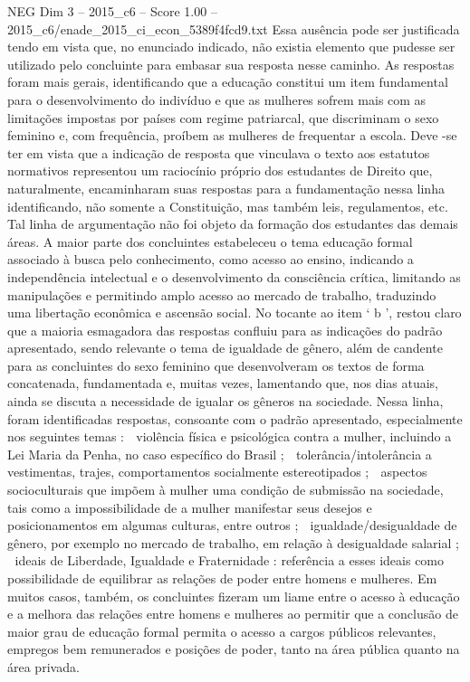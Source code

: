 \begin{textsample}{NEG Dim 3 – 2015\_c6 – Score 1.00 – 2015\_c6/enade\_2015\_ci\_econ\_5389f4fcd9.txt}
Essa ausência pode ser justificada tendo em vista que, no enunciado indicado, não existia elemento que pudesse ser utilizado pelo concluinte para embasar sua resposta nesse caminho.
As respostas foram mais gerais, identificando que a educação constitui um item fundamental para o desenvolvimento do indivíduo e que as mulheres sofrem mais com as limitações impostas por países com regime patriarcal, que discriminam o sexo feminino e, com frequência, proíbem as mulheres de frequentar a escola.
Deve -se ter em vista que a indicação de resposta que vinculava o texto aos estatutos normativos representou um raciocínio próprio dos estudantes de Direito que, naturalmente, encaminharam suas respostas para a fundamentação nessa linha identificando, não somente a Constituição, mas também leis, regulamentos, etc.
Tal linha de argumentação não foi objeto da formação dos estudantes das demais áreas.
A maior parte dos concluintes estabeleceu o tema educação formal associado à busca pelo conhecimento, como acesso ao ensino, indicando a independência intelectual e o desenvolvimento da consciência crítica, limitando as manipulações e permitindo amplo acesso ao mercado de trabalho, traduzindo uma libertação econômica e ascensão social.
No tocante ao item ‘ b ’, restou claro que a maioria esmagadora das respostas confluiu para as indicações do padrão apresentado, sendo relevante o tema de igualdade de gênero, além de candente para as concluintes do sexo feminino que desenvolveram os textos de forma concatenada, fundamentada e, muitas vezes, lamentando que, nos dias atuais, ainda se discuta a necessidade de igualar os gêneros na sociedade.
Nessa linha, foram identificadas respostas, consoante com o padrão apresentado, especialmente nos seguintes temas :  violência física e psicológica contra a mulher, incluindo a Lei Maria da Penha, no caso específico do Brasil ;  tolerância/intolerância a vestimentas, trajes, comportamentos socialmente estereotipados ;  aspectos socioculturais que impõem à mulher uma condição de submissão na sociedade, tais como a impossibilidade de a mulher manifestar seus desejos e posicionamentos em algumas culturas, entre outros ;  igualdade/desigualdade de gênero, por exemplo no mercado de trabalho, em relação à desigualdade salarial ;  ideais de Liberdade, Igualdade e Fraternidade : referência a esses ideais como possibilidade de equilibrar as relações de poder entre homens e mulheres.
Em muitos casos, também, os concluintes fizeram um liame entre o acesso à educação e a melhora das relações entre homens e mulheres ao permitir que a conclusão de maior grau de educação formal permita o acesso a cargos públicos relevantes, empregos bem remunerados e posições de poder, tanto na área pública quanto na área privada.

\end{textsample}

